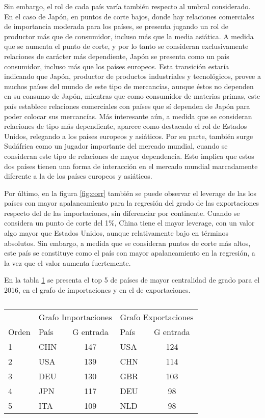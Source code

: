 \documentclass[class=article, crop=false]{standalone}
\begin{document}
Sin embargo, el rol de cada país varía también respecto al umbral considerado. En el caso de Japón, en puntos de corte bajos, donde hay relaciones comerciales de importancia moderada para los países, se presenta jugando un rol de productor más que de consumidor, incluso más que la media asiática. A medida que se aumenta el punto de corte, y por lo tanto se consideran exclusivamente relaciones de carácter más dependiente, Japón se presenta como un país consumidor, incluso más que los países europeos. Esta transición estaría indicando que Japón, productor de productos industriales y tecnológicos, provee a muchos países del mundo de este tipo de mercancías, aunque éstos no dependen en su consumo de Japón, mientras que como consumidor de materias primas, este país establece relaciones comerciales con países que sí dependen de Japón para poder colocar sus mercancías. Más interesante aún, a medida que se consideran relaciones de tipo más dependiente, aparece como destacado el rol de Estados Unidos, relegando a los países europeos y asiáticos. Por su parte, también surge Sudáfrica como un jugador importante del mercado mundial, cuando se consideran este tipo de relaciones de mayor dependencia. Esto implica que estos dos países tienen una forma de interacción en el mercado mundial marcadamente diferente a la de los países europeos y asiáticos.       

Por último, en la figura \ref{fig:corr} también se puede observar el leverage de las los países con mayor apalancamiento para la regresión del grado de las exportaciones respecto del de las importaciones, sin diferenciar por continente. Cuando se considera un punto de corte del 1\%, China tiene el mayor leverage, con un valor algo mayor que Estados Unidos, aunque relativamente bajo en términos absolutos. Sin embargo, a medida que se consideran puntos de corte más altos, este país se constituye como el país con mayor apalancamiento en la regresión, a la vez que el valor aumenta fuertemente.      

En la tabla \ref{Table: Tabla1} se presenta el top 5 de países de mayor centralidad de grado para el 2016, en el grafo de importaciones y en el de exportaciones.

\begin{table}
	\centering
	\caption{}
	\label{Table: Tabla1}
	\begin{tabular}{l|lc|lc|}
		& \multicolumn{2}{l|}{Grafo Importaciones} &  \multicolumn{2}{l|}{Grafo Exportaciones} \\
		Orden &           País &          G \degree  entrada &           País & G \degree  entrada          \\
		\hline
		1\degree &           CHN &          147 &           USA & 124         \\
		2\degree &           USA &          139 &           CHN & 114         \\
		3\degree &           DEU &          130 &           GBR & 103         \\
		4\degree &           JPN &          117 &           DEU & 98         \\
		5\degree &           ITA &          109 &           NLD & 98        
	\end{tabular}
\end{table}
\end{document}
